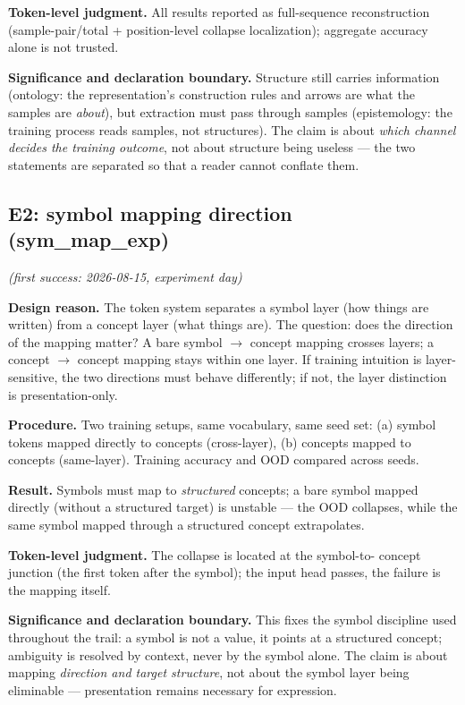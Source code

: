 \documentclass[sigplan,10pt,anonymous,review]{acmart}
\begin{document}
\textbf{Token-level judgment.} All results reported as full-sequence
reconstruction (sample-pair/total + position-level collapse localization);
aggregate accuracy alone is not trusted.

\textbf{Significance and declaration boundary.} Structure still carries
information (ontology: the representation's construction rules and arrows
are what the samples are \emph{about}), but extraction must pass through
samples (epistemology: the training process reads samples, not structures).
The claim is about \emph{which channel decides the training outcome}, not
about structure being useless --- the two statements are separated so that a
reader cannot conflate them.

\subsection{E2: symbol mapping direction (sym\_map\_exp)}\hfill\textit{(first success: 2026-08-15, experiment day)}

\textbf{Design reason.} The token system separates a symbol layer (how things
are written) from a concept layer (what things are). The question: does the
direction of the mapping matter? A bare symbol $\to$ concept mapping crosses
layers; a concept $\to$ concept mapping stays within one layer. If training
intuition is layer-sensitive, the two directions must behave differently;
if not, the layer distinction is presentation-only.

\textbf{Procedure.} Two training setups, same vocabulary, same seed set:
(a) symbol tokens mapped directly to concepts (cross-layer), (b) concepts
mapped to concepts (same-layer). Training accuracy and OOD compared across
seeds.

\textbf{Result.} Symbols must map to \emph{structured} concepts; a bare
symbol mapped directly (without a structured target) is unstable --- the
OOD collapses, while the same symbol mapped through a structured concept
extrapolates.

\textbf{Token-level judgment.} The collapse is located at the symbol-to-
concept junction (the first token after the symbol); the input head passes,
the failure is the mapping itself.

\textbf{Significance and declaration boundary.} This fixes the symbol
discipline used throughout the trail: a symbol is not a value, it points at
a structured concept; ambiguity is resolved by context, never by the symbol
alone. The claim is about mapping \emph{direction and target structure}, not
about the symbol layer being eliminable --- presentation remains necessary
for expression.
\end{document}
